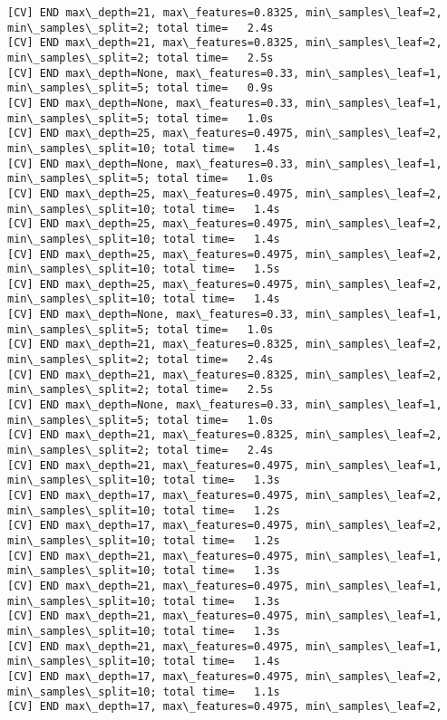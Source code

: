 \documentclass[11pt]{article}
\begin{document}
\begin{Verbatim}[commandchars=\\\{\}]
[CV] END max\_depth=21, max\_features=0.8325, min\_samples\_leaf=2,
min\_samples\_split=2; total time=   2.4s
[CV] END max\_depth=21, max\_features=0.8325, min\_samples\_leaf=2,
min\_samples\_split=2; total time=   2.5s
[CV] END max\_depth=None, max\_features=0.33, min\_samples\_leaf=1,
min\_samples\_split=5; total time=   0.9s
[CV] END max\_depth=None, max\_features=0.33, min\_samples\_leaf=1,
min\_samples\_split=5; total time=   1.0s
[CV] END max\_depth=25, max\_features=0.4975, min\_samples\_leaf=2,
min\_samples\_split=10; total time=   1.4s
[CV] END max\_depth=None, max\_features=0.33, min\_samples\_leaf=1,
min\_samples\_split=5; total time=   1.0s
[CV] END max\_depth=25, max\_features=0.4975, min\_samples\_leaf=2,
min\_samples\_split=10; total time=   1.4s
[CV] END max\_depth=25, max\_features=0.4975, min\_samples\_leaf=2,
min\_samples\_split=10; total time=   1.4s
[CV] END max\_depth=25, max\_features=0.4975, min\_samples\_leaf=2,
min\_samples\_split=10; total time=   1.5s
[CV] END max\_depth=25, max\_features=0.4975, min\_samples\_leaf=2,
min\_samples\_split=10; total time=   1.4s
[CV] END max\_depth=None, max\_features=0.33, min\_samples\_leaf=1,
min\_samples\_split=5; total time=   1.0s
[CV] END max\_depth=21, max\_features=0.8325, min\_samples\_leaf=2,
min\_samples\_split=2; total time=   2.4s
[CV] END max\_depth=21, max\_features=0.8325, min\_samples\_leaf=2,
min\_samples\_split=2; total time=   2.5s
[CV] END max\_depth=None, max\_features=0.33, min\_samples\_leaf=1,
min\_samples\_split=5; total time=   1.0s
[CV] END max\_depth=21, max\_features=0.8325, min\_samples\_leaf=2,
min\_samples\_split=2; total time=   2.4s
[CV] END max\_depth=21, max\_features=0.4975, min\_samples\_leaf=1,
min\_samples\_split=10; total time=   1.3s
[CV] END max\_depth=17, max\_features=0.4975, min\_samples\_leaf=2,
min\_samples\_split=10; total time=   1.2s
[CV] END max\_depth=17, max\_features=0.4975, min\_samples\_leaf=2,
min\_samples\_split=10; total time=   1.2s
[CV] END max\_depth=21, max\_features=0.4975, min\_samples\_leaf=1,
min\_samples\_split=10; total time=   1.3s
[CV] END max\_depth=21, max\_features=0.4975, min\_samples\_leaf=1,
min\_samples\_split=10; total time=   1.3s
[CV] END max\_depth=21, max\_features=0.4975, min\_samples\_leaf=1,
min\_samples\_split=10; total time=   1.3s
[CV] END max\_depth=21, max\_features=0.4975, min\_samples\_leaf=1,
min\_samples\_split=10; total time=   1.4s
[CV] END max\_depth=17, max\_features=0.4975, min\_samples\_leaf=2,
min\_samples\_split=10; total time=   1.1s
[CV] END max\_depth=17, max\_features=0.4975, min\_samples\_leaf=2,

\end{Verbatim}
\end{document}
